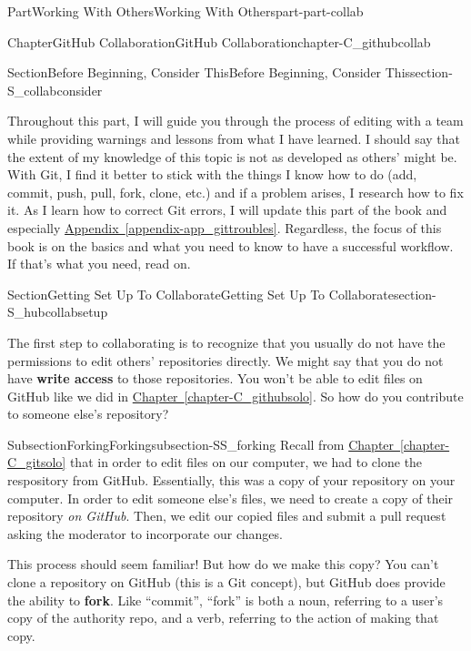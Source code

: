 \documentclass[oneside,10pt,]{book}
\newcommand{\xreffont}{\relax}
\newcommand{\terminology}[1]{\textbf{#1}}
\begin{document}
\begin{partptx}{Part}{Working With Others}{}{Working With Others}{}{}{part-part-collab}
\begin{chapterptx}{Chapter}{GitHub Collaboration}{}{GitHub Collaboration}{}{}{chapter-C_githubcollab}
\begin{sectionptx}{Section}{Before Beginning, Consider This}{}{Before Beginning, Consider This}{}{}{section-S_collabconsider}
\par
Throughout this part, I will guide you through the process of editing with a team while providing warnings and lessons from what I have learned. I should say that the extent of my knowledge of this topic is not as developed as others' might be. With Git, I find it better to stick with the things I know how to do (add, commit, push, pull, fork, clone, etc.) and if a problem arises, I research how to fix it. As I learn how to correct Git errors, I will update this part of the book and especially \hyperref[appendix-app_gittroubles]{Appendix~{\xreffont\ref{appendix-app_gittroubles}}}. Regardless, the focus of this book is on the basics and what you need to know to have a successful workflow. If that's what you need, read on.%
\end{sectionptx}
%
%
\typeout{************************************************}
\typeout{************************************************}
%
\begin{sectionptx}{Section}{Getting Set Up To Collaborate}{}{Getting Set Up To Collaborate}{}{}{section-S_hubcollabsetup}
%
%
\begin{introduction}{}%
The first step to collaborating is to recognize that you usually do not have the permissions to edit others' repositories directly. We might say that you do not have \terminology{write access} to those repositories. You won't be able to edit files on GitHub like we did in \hyperref[chapter-C_githubsolo]{Chapter~{\xreffont\ref{chapter-C_githubsolo}}}. So how do you contribute to someone else's repository?%
\end{introduction}%
%
%
\typeout{************************************************}
\typeout{************************************************}
%
\begin{subsectionptx}{Subsection}{Forking}{}{Forking}{}{}{subsection-SS_forking}
%
%
Recall from \hyperref[chapter-C_gitsolo]{Chapter~{\xreffont\ref{chapter-C_gitsolo}}} that in order to edit files on our computer, we had to clone the respository from GitHub. Essentially, this was a copy of your repository on your computer. In order to edit someone else's files, we need to create a copy of their repository \emph{on GitHub}. Then, we edit our copied files and submit a pull request asking the moderator to incorporate our changes.%
\par
This process should seem familiar! But how do we make this copy? You can't clone a repository on GitHub (this is a Git concept), but GitHub does provide the ability to \terminology{fork}. Like ``commit'', ``fork'' is both a noun, referring to a user's copy of the authority repo, and a verb, referring to the action of making that copy.%

\end{subsectionptx}
\end{sectionptx}
\end{chapterptx}
\end{partptx}
\end{document}
